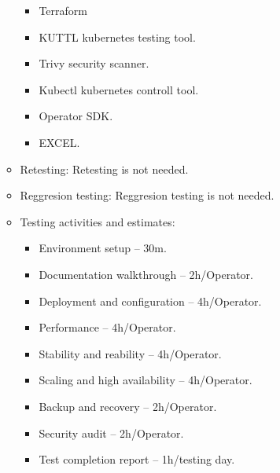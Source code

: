 \begin{itemize}
\begin{itemize}
\begin{itemize}
                  \item Terraform
                  \item KUTTL kubernetes testing tool.
                  \item Trivy security scanner.
                  \item Kubectl kubernetes controll tool.
                  \item Operator SDK.
                  \item EXCEL.
                \end{itemize}
          \item Retesting: Retesting is not needed.
          \item Reggresion testing: Reggresion testing is not needed.
          \item Testing activities and estimates:
                \begin{itemize}
                  \item Environment setup – 30m.
                  \item Documentation walkthrough – 2h/Operator.
                  \item Deployment and configuration – 4h/Operator.
                  \item Performance – 4h/Operator.
                  \item Stability and reability – 4h/Operator.
                  \item Scaling and high availability – 4h/Operator.
                  \item Backup and recovery – 2h/Operator.
                  \item Security audit – 2h/Operator.
                  \item Test completion report – 1h/testing day.
                \end{itemize}


\end{itemize}
\end{itemize}
